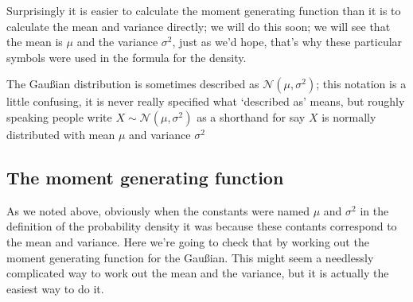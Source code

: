\documentclass[11pt,a4paper]{scrartcl}
\begin{document}
Surprisingly it is easier to calculate the moment generating function
than it is to calculate the mean and variance directly; we will do
this soon; we will see that the mean is $\mu$ and the variance
$\sigma^2$, just as we'd hope, that's why these particular symbols
were used in the formula for the density.

The Gau\ss{}ian distribution is sometimes described as
$\mathcal{N}(\mu,\sigma^2)$; this notation is a little confusing, it is never
really specified what \lq{}described as\rq{} means, but roughly
speaking people write $X\sim \mathcal{N}(\mu,\sigma^2)$ as a shorthand for say
$X$ is normally distributed with mean $\mu$ and variance $\sigma^2$

\subsection*{The moment generating function}

As we noted above, obviously when the constants were named $\mu$ and
$\sigma^2$ in the definition of the probability density it was because
these contants correspond to the mean and variance. Here we're going
to check that by working out the moment generating function for the
Gau\ss{}ian. This might seem a needlessly complicated way to work out
the mean and the variance, but it is actually the easiest way to do
it.
\end{document}
